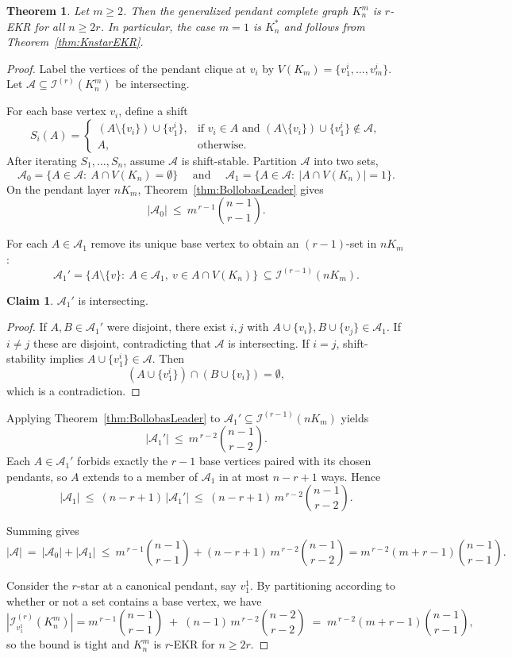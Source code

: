 \documentclass{article}
\newtheorem{theorem}{Theorem}
\theoremstyle{definition}
\newtheorem{claim}{Claim}
\newcommand{\A}{\mathcal{A}}
\newcommand{\1}{\mathbf{1}}
\begin{document}
\medskip

\begin{theorem}\label{thm:PendantKn}
Let $m\ge 2$. Then the generalized pendant complete graph $K_n^m$ is $r$-EKR for all $n\ge 2r$.
In particular, the case $m=1$ is $K_n^*$ and follows from Theorem~\ref{thm:KnstarEKR}.
\end{theorem}

\begin{proof}
Label the vertices of the pendant clique at $v_i$ by $V(K_m)=\{v_1^i,\dots,v_m^i\}$. Let $\A\subseteq \mathcal{I}^{(r)}(K_n^m)$ be intersecting.


For each base vertex $v_i$, define a shift
\[
S_i(A)=
\begin{cases}
(A\setminus\{v_i\})\cup\{v_1^i\}, &\text{if } v_i\in A \text{ and } (A\setminus\{v_i\})\cup\{v_1^i\}\notin \A,\\
A,&\text{otherwise}.
\end{cases}
\]
After iterating $S_1,\dots,S_n$, assume $\A$ is shift-stable. Partition $\A$ into two sets,
\[
\A_0=\{A\in\A:\ A\cap V(K_n)=\emptyset\} \quad \text{ and }
\quad
\A_1=\{A\in\A:\ |A\cap V(K_n)|=1\}.
\]
On the pendant layer $nK_m$, Theorem~\ref{thm:BollobasLeader} gives
\[
|\A_0|\ \le\ m^{\,r-1}\binom{n-1}{r-1}.
\]

For each $A\in\A_1$ remove its unique base vertex to obtain an $(r-1)$-set in $nK_m$:
\[
\A_1'=\{A\setminus\{v\}:\ A\in\A_1,\ v\in A\cap V(K_n)\}\ \subseteq \mathcal{I}^{(r-1)}(nK_m).
\]

\bigskip

\begin{claim}\label{cl:A1prime-int}
$\A_1'$ is intersecting.
\end{claim}
\begin{proof}
If $A,B\in \A_1'$ were disjoint, there exist $i,j$ with $A\cup\{v_i\},B\cup\{v_j\}\in\A_1$. If $i\ne j$ these are disjoint, contradicting that $\A$ is intersecting. If $i=j$, shift-stability implies $A\cup\{v_1^i\}\in\A$. Then 
\[
(A\cup\{v_1^i\})\cap (B\cup\{v_i\})=\emptyset,
\]
which is a contradiction.
\end{proof}

\bigskip

Applying Theorem~\ref{thm:BollobasLeader} to $\A_1'\subseteq \mathcal{I}^{(r-1)}(nK_m)$ yields
\[
|\A_1'|\ \le\ m^{\,r-2}\binom{n-1}{r-2}.
\]
Each $A\in\A_1'$ forbids exactly the $r-1$ base vertices paired with its chosen pendants, so $A$ extends to a member of $\A_1$ in at most $n-r+1$ ways. Hence
\[
|\A_1|\ \le\ (n-r+1)\,|\A_1'|\ \le\ (n-r+1)\,m^{\,r-2}\binom{n-1}{r-2}.
\]

Summing gives
\[
|\A|\ =\ |\A_0|+|\A_1|\ \le\ m^{\,r-1}\binom{n-1}{r-1}+(n-r+1)\,m^{\,r-2}\binom{n-1}{r-2}
= m^{\,r-2}(m+r-1)\binom{n-1}{r-1}.
\]


Consider the $r$-star at a canonical pendant, say $v_1^1$. By partitioning according to whether or not a set contains a base vertex, we have
\[
|\mathcal{I}^{(r)}_{v_1^1}(K_n^m)|
=
m^{\,r-1}\binom{n-1}{r-1}
\;+\;
(n-1)\,m^{\,r-2}\binom{n-2}{r-2}
\;=\; m^{\,r-2}(m+r-1)\binom{n-1}{r-1},
\]
so the bound is tight and $K_n^m$ is $r$-EKR for $n\ge 2r$.
\end{proof}
\end{document}
